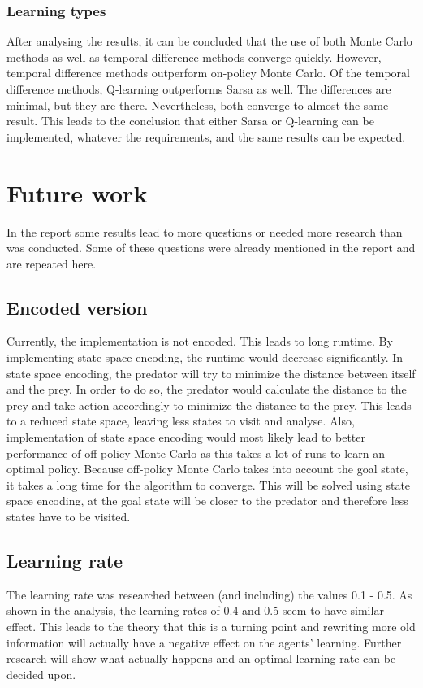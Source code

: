 \documentclass{article}
\begin{document}
\subsubsection{Learning types}
After analysing the results, it can be concluded that the use of both Monte Carlo methods as well as temporal difference methods converge quickly. However, temporal difference methods outperform on-policy Monte Carlo. Of the temporal difference methods, Q-learning outperforms Sarsa as well. The differences are minimal, but they are there. Nevertheless, both converge to almost the same result. This leads to the conclusion that either Sarsa or Q-learning can be implemented, whatever the requirements, and the same results can be expected.
\pagebreak
\section{Future work}
In the report some results lead to more questions or needed more research than was conducted. Some of these questions were already mentioned in the report and are repeated here. 

\subsection{Encoded version}
Currently, the implementation is not encoded. This leads to long runtime. By implementing state space encoding, the runtime would decrease significantly. In state space encoding, the predator will try to minimize the distance between itself and the prey. In order to do so, the predator would calculate the distance to the prey and take action accordingly to minimize the distance to the prey. This leads to a reduced state space, leaving less states to visit and analyse. Also, implementation of state space encoding would most likely lead to better performance of off-policy Monte Carlo as this takes a lot of runs to learn an optimal policy. Because off-policy Monte Carlo takes into account the goal state, it takes a long time for the algorithm to converge. This will be solved using state space encoding, at the goal state will be closer to the predator and therefore less states have to be visited.

\subsection{Learning rate}
The learning rate was researched between (and including) the values 0.1 - 0.5.  As shown in the analysis, the learning rates of 0.4 and 0.5 seem to have similar effect. This leads to the theory that this is a turning point and rewriting more old information will actually have a negative effect on the agents' learning. Further research will show what actually happens and an optimal learning rate can be decided upon.
\end{document}
